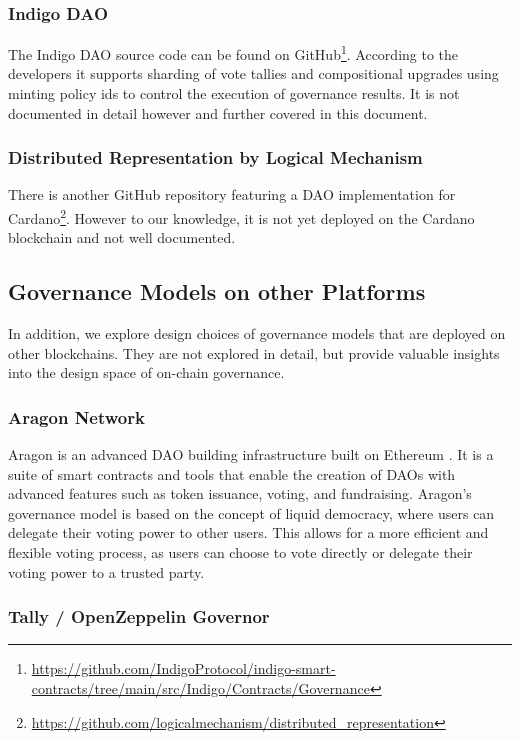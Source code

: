\documentclass[11pt]{article}
\begin{document}
\subsubsection{Indigo DAO}

The Indigo DAO source code can be found on GitHub\footnote{\url{https://github.com/IndigoProtocol/indigo-smart-contracts/tree/main/src/Indigo/Contracts/Governance}}.
According to the developers it supports sharding of vote tallies and compositional upgrades using minting policy ids to control the execution of governance results.
It is not documented in detail however and further covered in this document.

\subsubsection{Distributed Representation by Logical Mechanism}

There is another GitHub repository featuring a DAO implementation for Cardano\footnote{\url{https://github.com/logicalmechanism/distributed_representation}}.
However to our knowledge, it is not yet deployed on the Cardano blockchain and not well documented.

\subsection{Governance Models on other Platforms}

In addition, we explore design choices of governance models that are deployed on other blockchains.
They are not explored in detail, but provide valuable insights into the design space of on-chain governance.

\subsubsection{Aragon Network}

Aragon is an advanced DAO building infrastructure built on Ethereum \cite{aragon}.
It is a suite of smart contracts and tools that enable the creation of DAOs with advanced features such as token issuance, voting, and fundraising.
Aragon's governance model is based on the concept of liquid democracy, where users can delegate their voting power to other users.
This allows for a more efficient and flexible voting process, as users can choose to vote directly or delegate their voting power to a trusted party.

\subsubsection{Tally / OpenZeppelin Governor}
\end{document}
